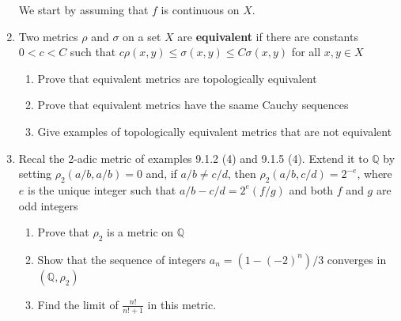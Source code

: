 \documentclass[letterpaper]{article}
\begin{document}
\begin{enumerate}
  We start by assuming that $f$ is continuous on $X$. 
\renewcommand{\labelenumii}{(\alph{enumii})}
\setcounter{enumi}{7}
\item
Two metrics $\rho$ and $\sigma$ on a set $X$ are {\bf equivalent} if there are
constants $0<c<C$ such that $c\rho(x,y)\le\sigma(x,y)\le C\sigma(x,y)$ for all
$x,y\in X$
  \begin{enumerate}
    \item
    Prove that equivalent metrics are topologically equivalent
    \item
    Prove that equivalent metrics have the saame Cauchy sequences
    \item
    Give examples of topologically equivalent metrics that are not equivalent
  \end{enumerate}
\setcounter{enumi}{10}
\item
Recal the 2-adic metric of examples 9.1.2 (4) and 9.1.5 (4). Extend it to
$\mathbb{Q}$ by setting $\rho_2(a/b,a/b)=0$ and, if $a/b\ne c/d$, then
$\rho_2(a/b,c/d)=2^{-e}$, where $e$ is the unique integer such that
$a/b-c/d=2^e(f/g)$ and both $f$ and $g$ are odd integers
  \begin{enumerate}
    \item
    Prove that $\rho_2$ is a metric on $\mathbb{Q}$
    \item
    Show that the sequence of integers $a_n=(1-(-2)^n)/3$ converges in
$(\mathbb{Q},\rho_2)$
    \item
    Find the limit of $\displaystyle \frac{n!}{n!+1}$ in this metric.
  \end{enumerate}
\end{enumerate}
\end{document}
